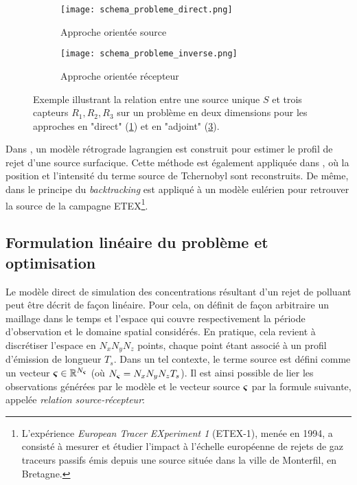  \begin{figure}[h]
 	\begin{subfigure}{0.5\textwidth}
 		\texttt{[image: schema\_probleme\_direct.png]}
 		\caption{Approche orientée source}
 		\label{schema_probleme_direct}
 	\end{subfigure}
 	\begin{subfigure}{0.5\textwidth}
 		\texttt{[image: schema\_probleme\_inverse.png]}
 		\caption{Approche orientée récepteur}
 		\label{schema_probleme_inverse}
 	\end{subfigure}
 	\caption{Exemple illustrant la relation entre une source unique $S$ et trois capteurs $R_1,R_2,R_3$ sur un problème en deux dimensions pour les approches en "direct" (\ref{schema_probleme_direct}) et en "adjoint" (\ref{schema_probleme_inverse}). }
 \end{figure}
 
 Dans \cite{Flesch1995}, un modèle {rétrograde} lagrangien est construit pour estimer le profil de rejet d'une source surfacique.  Cette méthode est également appliquée dans \cite{Pudykiewicz1998}, où la position et l'intensité du terme source de Tchernobyl sont reconstruits. De même, dans \cite{Hourdin2006b} le principe du \textit{backtracking} est appliqué à un modèle eulérien pour retrouver la source de la campagne ETEX\footnote{L’expérience \textit{European Tracer EXperiment 1} (ETEX-1), menée en 1994,  a consisté à mesurer et étudier l'impact à l'échelle européenne de rejets de gaz traceurs passifs émis depuis une source située dans la ville de Monterfil, en Bretagne.}.\\
 
 \subsection{Formulation linéaire du problème et optimisation}
 \label{subsection_MCO}
 
Le modèle direct de simulation des concentrations résultant d'un rejet de polluant peut être décrit de façon linéaire. Pour cela, on définit de façon arbitraire un maillage dans le temps et l'espace qui couvre respectivement la période d'observation et le domaine spatial considérés. En pratique, cela revient à discrétiser l'espace en $N_xN_yN_z$ points, chaque point étant associé à un profil d'émission de longueur $T_s$. Dans un tel contexte, le terme source est défini comme un vecteur ${\bm{\varsigma}} \in \mathbb{R}^{N_{\bm{\varsigma}}}$ (où $N_{\bm{\varsigma}} = N_xN_yN_zT_s$). Il est ainsi possible de lier les observations générées par le modèle et le vecteur source ${\bm{\varsigma}}$ par la formule suivante, appelée \textit{relation source-récepteur}:

